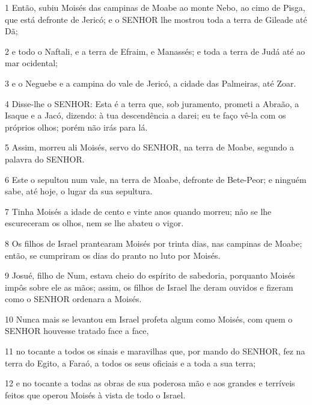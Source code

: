 \par 1 Então, subiu Moisés das campinas de Moabe ao monte Nebo, ao cimo de Pisga, que está defronte de Jericó; e o SENHOR lhe mostrou toda a terra de Gileade até Dã;
\par 2 e todo o Naftali, e a terra de Efraim, e Manassés; e toda a terra de Judá até ao mar ocidental;
\par 3 e o Neguebe e a campina do vale de Jericó, a cidade das Palmeiras, até Zoar.
\par 4 Disse-lhe o SENHOR: Esta é a terra que, sob juramento, prometi a Abraão, a Isaque e a Jacó, dizendo: à tua descendência a darei; eu te faço vê-la com os próprios olhos; porém não irás para lá.
\par 5 Assim, morreu ali Moisés, servo do SENHOR, na terra de Moabe, segundo a palavra do SENHOR.
\par 6 Este o sepultou num vale, na terra de Moabe, defronte de Bete-Peor; e ninguém sabe, até hoje, o lugar da sua sepultura.
\par 7 Tinha Moisés a idade de cento e vinte anos quando morreu; não se lhe escureceram os olhos, nem se lhe abateu o vigor.
\par 8 Os filhos de Israel prantearam Moisés por trinta dias, nas campinas de Moabe; então, se cumpriram os dias do pranto no luto por Moisés.
\par 9 Josué, filho de Num, estava cheio do espírito de sabedoria, porquanto Moisés impôs sobre ele as mãos; assim, os filhos de Israel lhe deram ouvidos e fizeram como o SENHOR ordenara a Moisés.
\par 10 Nunca mais se levantou em Israel profeta algum como Moisés, com quem o SENHOR houvesse tratado face a face,
\par 11 no tocante a todos os sinais e maravilhas que, por mando do SENHOR, fez na terra do Egito, a Faraó, a todos os seus oficiais e a toda a sua terra;
\par 12 e no tocante a todas as obras de sua poderosa mão e aos grandes e terríveis feitos que operou Moisés à vista de todo o Israel.



